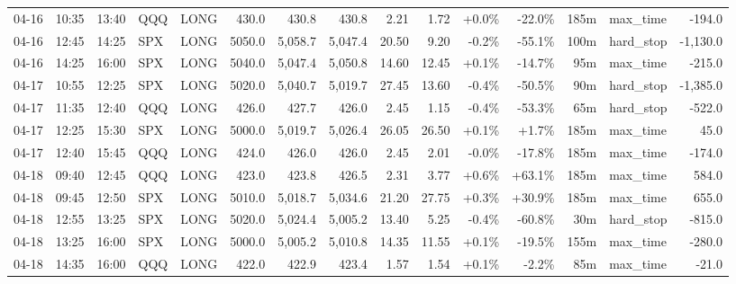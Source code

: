 \documentclass[11pt,a4paper,twoside]{article}
\begin{document}
\begin{landscape}
\begin{center}
\begin{longtable}{>{\color{txtmain}}l l l l l r r r r r r r r >{\color{txtmain}}l r}
04-16 & 10:35 & 13:40 & QQQ & LONG & 430.0 & 430.8 & 430.8 & 2.21 & 1.72 & \textcolor{wingreen}{+0.0\%} & \textcolor{lossred}{-22.0\%} & 185m & max\_time & \textcolor{lossred}{-194.0} \\
04-16 & 12:45 & 14:25 & SPX & LONG & 5050.0 & 5,058.7 & 5,047.4 & 20.50 & 9.20 & \textcolor{lossred}{-0.2\%} & \textcolor{lossred}{-55.1\%} & 100m & hard\_stop & \textcolor{lossred}{-1,130.0} \\
04-16 & 14:25 & 16:00 & SPX & LONG & 5040.0 & 5,047.4 & 5,050.8 & 14.60 & 12.45 & \textcolor{wingreen}{+0.1\%} & \textcolor{lossred}{-14.7\%} & 95m & max\_time & \textcolor{lossred}{-215.0} \\
04-17 & 10:55 & 12:25 & SPX & LONG & 5020.0 & 5,040.7 & 5,019.7 & 27.45 & 13.60 & \textcolor{lossred}{-0.4\%} & \textcolor{lossred}{-50.5\%} & 90m & hard\_stop & \textcolor{lossred}{-1,385.0} \\
04-17 & 11:35 & 12:40 & QQQ & LONG & 426.0 & 427.7 & 426.0 & 2.45 & 1.15 & \textcolor{lossred}{-0.4\%} & \textcolor{lossred}{-53.3\%} & 65m & hard\_stop & \textcolor{lossred}{-522.0} \\
04-17 & 12:25 & 15:30 & SPX & LONG & 5000.0 & 5,019.7 & 5,026.4 & 26.05 & 26.50 & \textcolor{wingreen}{+0.1\%} & \textcolor{wingreen}{+1.7\%} & 185m & max\_time & \textcolor{wingreen}{45.0} \\
04-17 & 12:40 & 15:45 & QQQ & LONG & 424.0 & 426.0 & 426.0 & 2.45 & 2.01 & \textcolor{lossred}{-0.0\%} & \textcolor{lossred}{-17.8\%} & 185m & max\_time & \textcolor{lossred}{-174.0} \\
04-18 & 09:40 & 12:45 & QQQ & LONG & 423.0 & 423.8 & 426.5 & 2.31 & 3.77 & \textcolor{wingreen}{+0.6\%} & \textcolor{wingreen}{+63.1\%} & 185m & max\_time & \textcolor{wingreen}{584.0} \\
04-18 & 09:45 & 12:50 & SPX & LONG & 5010.0 & 5,018.7 & 5,034.6 & 21.20 & 27.75 & \textcolor{wingreen}{+0.3\%} & \textcolor{wingreen}{+30.9\%} & 185m & max\_time & \textcolor{wingreen}{655.0} \\
04-18 & 12:55 & 13:25 & SPX & LONG & 5020.0 & 5,024.4 & 5,005.2 & 13.40 & 5.25 & \textcolor{lossred}{-0.4\%} & \textcolor{lossred}{-60.8\%} & 30m & hard\_stop & \textcolor{lossred}{-815.0} \\
04-18 & 13:25 & 16:00 & SPX & LONG & 5000.0 & 5,005.2 & 5,010.8 & 14.35 & 11.55 & \textcolor{wingreen}{+0.1\%} & \textcolor{lossred}{-19.5\%} & 155m & max\_time & \textcolor{lossred}{-280.0} \\
04-18 & 14:35 & 16:00 & QQQ & LONG & 422.0 & 422.9 & 423.4 & 1.57 & 1.54 & \textcolor{wingreen}{+0.1\%} & \textcolor{lossred}{-2.2\%} & 85m & max\_time & \textcolor{lossred}{-21.0} \\

\end{longtable}
\end{center}
\end{landscape}
\end{document}
